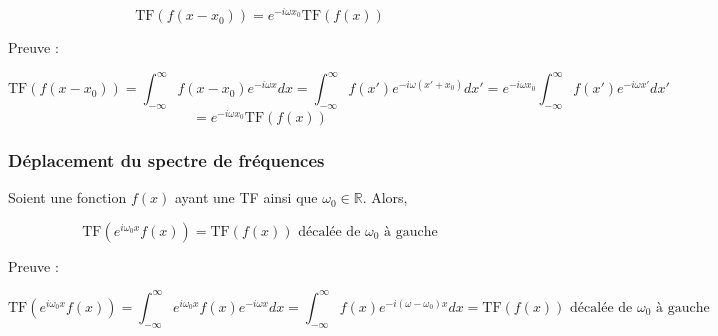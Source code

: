 \begin{equation}
    \text{TF}\left(f(x-x_0)\right) = e^{-i\omega x_0}\text{TF}\left(f(x)\right)
    \label{eq_deplacement_temps_TF}
\end{equation}

Preuve :

\begin{equation*}
    \text{TF}\left(f(x-x_0)\right) = \int_{-\infty}^{\infty}f(x-x_0)e^{-i\omega x}dx = \int_{-\infty}^{\infty}f(x')e^{-i\omega (x'+x_0)}dx' = e^{-i\omega x_0}\int_{-\infty}^{\infty}f(x')e^{-i\omega x'} dx'
\end{equation*}
\begin{equation*}
    = e^{-i\omega x_0}\text{TF}\left(f(x)\right)
\end{equation*}

\subsubsection{Déplacement du spectre de fréquences}
Soient une fonction $f(x)$ ayant une TF ainsi que $\omega_0 \in \mathbb{R}$. Alors,

\begin{equation}
    \text{TF}\left(e^{i\omega_0 x}f(x)\right) = \text{TF}(f(x)) \text{ décalée de $\omega_0$ à gauche}
\end{equation}

Preuve : 

\begin{equation*}
    \text{TF}\left(e^{i\omega_0 x}f(x)\right) =  \int_{-\infty}^{\infty}e^{i\omega_0 x}f(x)e^{-i\omega x}dx = \int_{-\infty}^{\infty}f(x)e^{-i(\omega-\omega_0)x}dx = \text{TF}(f(x)) \text{ décalée de $\omega_0$ à gauche}
\end{equation*}

